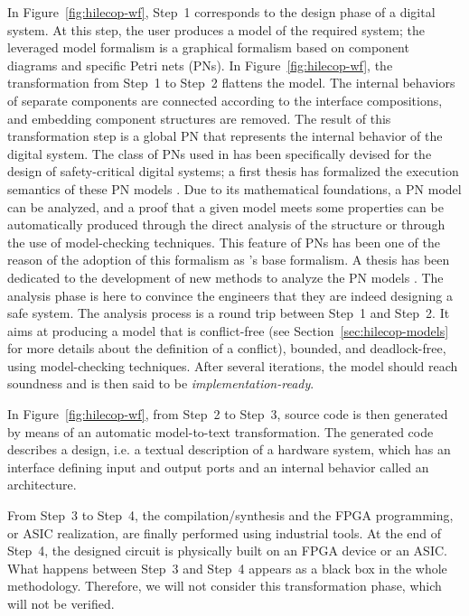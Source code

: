 \documentclass[pdflatex,sn-mathphys]{sn-jnl}%
\theoremstyle{thmstyleone}%
\theoremstyle{thmstyletwo}%
\theoremstyle{thmstylethree}%
\begin{document}
In Figure~\ref{fig:hilecop-wf}, Step~1 corresponds to the design phase
of a digital system. At this step, the user produces a model of the
required system; the leveraged model formalism is a graphical
formalism based on component diagrams and specific Petri nets (PNs).
In Figure~\ref{fig:hilecop-wf}, the transformation from Step~1 to
Step~2 flattens the model. The internal behaviors of separate
components are connected according to the interface compositions, and
embedding component structures are removed. The result of this
transformation step is a global PN that represents the internal
behavior of the digital system.  The class of PNs used in \hilecop{}
has been specifically devised for the design of safety-critical
digital systems; a first thesis has formalized the execution semantics
of these PN models \cite{Leroux2014}. %
Due to its mathematical
foundations, a PN model can be analyzed, and a proof that a given
model meets some properties can be automatically produced through the
direct analysis of the structure or through the use of model-checking
techniques. This feature of PNs has been one of the reason of the
adoption of this formalism as \hilecop{}'s base formalism. A thesis
has been dedicated to the development of new methods to analyze the
\hilecop{} PN models \cite{Merzoug2018}. The analysis phase is here to
convince the engineers that they are indeed designing a safe
system. The analysis process is a round trip between Step~1 and
Step~2.  It aims at producing a model that is conflict-free (see
Section~\ref{sec:hilecop-models} for more details about the definition
of a conflict), bounded, and deadlock-free, using model-checking
techniques.  After several iterations, the model should reach
soundness and is then said to be \emph{implementation-ready}.

In Figure~\ref{fig:hilecop-wf}, from Step~2 to Step~3, \vhdl{} source
code is then generated by means of an automatic model-to-text
transformation. The generated code describes a \vhdl{} design, i.e. a
textual description of a hardware system, which has an interface
defining input and output ports and an internal behavior called an
architecture.

From Step~3 to Step~4, the \vhdl{} compilation/synthesis and the FPGA
programming, or ASIC realization, are finally performed using
industrial tools. At the end of Step~4, the designed circuit is
physically built on an FPGA device or an ASIC.  What happens between
Step~3 and Step~4 appears as a black box in the whole \hilecop{}
methodology. Therefore, we will not consider this transformation
phase, which will not be verified.
\end{document}
